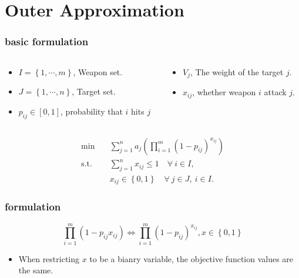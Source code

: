 \documentclass[CJK,10pt]{beamer}
\begin{document}
\section{Outer Approximation}
\begin{frame}
    \frametitle{basic formulation}
    \begin{columns}
        \begin{column}{.50\linewidth}
            \footnotesize
            \begin{itemize}
                \item $I = \left\{1,\cdots,m\right\} $, Weapon set.
                \item $J = \left\{1,\cdots,n\right\} $, Target set.
                \item $p_{ij}\in [0,1]$, probability that $i$ hits $j$
            \end{itemize}
        \end{column}
    \hspace{-1cm}
        \begin{column}{.50\linewidth}
            \footnotesize
            \begin{itemize}
                \item $V_j$, The weight of the target $j$.
                \item $x_{ij}$, whether weapon $i$ attack $j$.
            \end{itemize}
        \end{column}
    \end{columns}
    
    \begin{align*} \tag{S0}
        \min\quad & \sum_{j=1}^n a_j \left( \prod_{i=1}^m (1 -  p_{ij})^{x_{ij}} \right) \\ 
        \mathrm{s. t.}\quad &\sum_{j=1}^n x_{ij} \leq 1\quad \forall ~i \in I,\\
        & x_{ij} \in \left\{ 0,1 \right\} \quad \forall~ j\in J , ~ i \in I.
    \end{align*}
\end{frame}

\begin{frame}
    \frametitle{formulation}
    \begin{equation*}
        \prod_{i=1}^{m}{(1-p_{ij}x_{ij})} \iff \prod_{i=1}^{m}{(1-p_{ij})^{x_{ij}}}, x \in \left\{ 0,1 \right\}
    \end{equation*}
    \begin{itemize}
        \item When restricting $x$ to be a bianry variable, the objective function values are the same.
    \end{itemize}
\end{frame}
\end{document}

